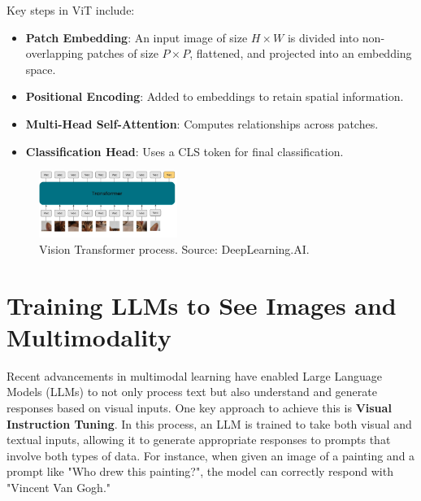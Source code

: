 Key steps in ViT include:

\begin{itemize}
    \item \textbf{Patch Embedding}: An input image of size \( H \times W \) is divided into non-overlapping patches of size \( P \times P \), flattened, and projected into an embedding space.
    \item \textbf{Positional Encoding}: Added to embeddings to retain spatial information.
    \item \textbf{Multi-Head Self-Attention}: Computes relationships across patches.
    \item \textbf{Classification Head}: Uses a CLS token for final classification.
\end{itemize}

\begin{figure}[h]
    \centering
    \includegraphics[width=0.4\textwidth]{IMAGES/immagine_2025-02-26_112630864.png}
    \caption[Vision Transformer]{Vision Transformer process. Source: DeepLearning.AI.\footnotemark[4]}
    \label{fig:Vi Transformer }
\end{figure}

\section{Training LLMs to See Images and Multimodality}
Recent advancements in multimodal learning have enabled Large Language Models (LLMs) to not only process text but also understand and generate responses based on visual inputs. One key approach to achieve this is \textbf{Visual Instruction Tuning}. In this process, an LLM is trained to take both visual and textual inputs, allowing it to generate appropriate responses to prompts that involve both types of data. For instance, when given an image of a painting and a prompt like "Who drew this painting?", the model can correctly respond with "Vincent Van Gogh."

